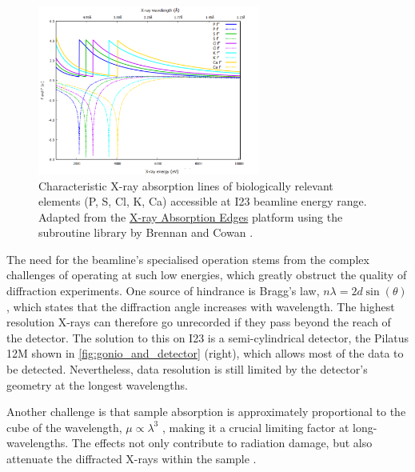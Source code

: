 \begin{figure}[h]
    \centering
    \includegraphics[width = 0.65\textwidth]{images/absorption lines high quality cropped.png}
    \caption{Characteristic X-ray absorption lines of biologically relevant elements (P, S, Cl, K, Ca) accessible at I23 beamline energy range. Adapted from the \href{http://skuld.bmsc.washington.edu/scatter/AS_periodic.html}{X-ray Absorption Edges} platform using the subroutine library by Brennan and Cowan \cite{Brennan1992}.}%
    \label{Anomaluos scattering edges}
\end{figure}

The need for the beamline's specialised operation stems from the complex challenges of operating at such low energies, which greatly obstruct the quality of diffraction experiments.
One source of hindrance is Bragg’s law, $nλ = 2d \sin(\theta)$, which states that the diffraction angle increases with wavelength. The highest resolution X-rays can therefore go unrecorded if they pass beyond the reach of the detector. The solution to this on I23 is a semi-cylindrical detector, the Pilatus 12M shown in \cref{fig:gonio_and_detector} (right), which allows most of the data to be detected. Nevertheless, data resolution is still limited by the detector’s geometry at the longest wavelengths.

 Another challenge is that sample absorption is approximately proportional to the cube of the wavelength, $\mu \propto \lambda^3$ \cite{Arndt1984}, making it a crucial limiting factor at long-wavelengths. The effects not only contribute to radiation damage, but also attenuate the diffracted X-rays within the sample \cite{Wagner2016}.

